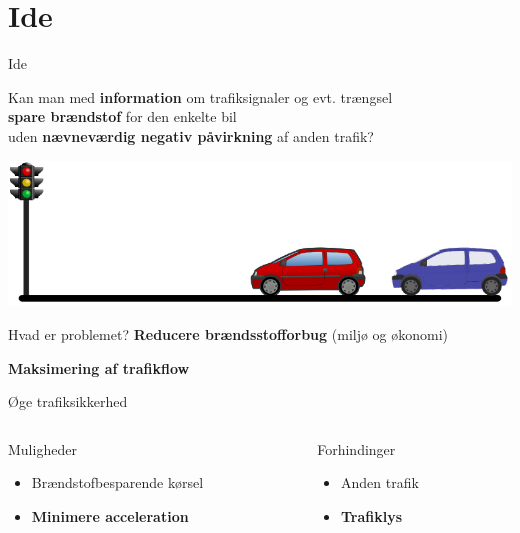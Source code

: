 \section{Ide}

\begin{frame}{Ide}
\begin{center}
Kan man med \textbf{information} om trafiksignaler og evt. trængsel\\\textbf{spare brændstof} for den enkelte bil\\uden \textbf{nævneværdig negativ påvirkning} af anden trafik?
\end{center}
\includegraphics[width=1\textwidth]{../images/idea.png}
\end{frame}

\begin{frame}{Hvad er problemet?}
\textbf{Reducere brændsstofforbug} (miljø og økonomi)

\textbf{Maksimering af trafikflow}

Øge trafiksikkerhed

\vspace{5mm}
\begin{columns}
\begin{column}{0.5\textwidth}
Muligheder
\begin{itemize}
\item Brændstofbesparende kørsel
\item \textbf{Minimere acceleration}
\end{itemize}

\end{column}
\begin{column}{0.4\textwidth}
Forhindinger
\begin{itemize}
\item Anden trafik
\item \textbf{Trafiklys}
\end{itemize}
\end{column}
\end{columns}
\end{frame}

